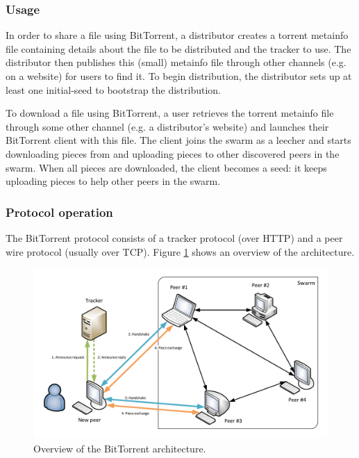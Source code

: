 \subsubsection{Usage}
In order to share a file using BitTorrent, a distributor creates a torrent metainfo file containing details about the file to be distributed and the tracker to use. The distributor then publishes this (small) metainfo file through other channels (e.g. on a website) for users to find it. To begin distribution, the distributor sets up at least one \gls{initial-seed} to bootstrap the distribution.

To download a file using BitTorrent, a user retrieves the torrent metainfo file through some other channel (e.g. a distributor's website) and launches their BitTorrent client with this file. The client joins the swarm as a \gls{leecher} and starts downloading pieces from and uploading pieces to other discovered peers in the swarm. When all pieces are downloaded, the client becomes a \gls{seed}: it keeps uploading pieces to help other peers in the swarm.

\subsubsection{Protocol operation}
The BitTorrent protocol consists of a tracker protocol (over \gls{HTTP}) and a peer wire protocol (usually over \gls{TCP}). Figure \ref{fig:related:bittorrent} shows an overview of the architecture.

\begin{figure}
    \centering
    \includegraphics[width=\textwidth]{diagrams/bittorrent.pdf}
    \caption[BitTorrent architectural overview]{Overview of the BitTorrent architecture.}
    \label{fig:related:bittorrent}
\end{figure}

